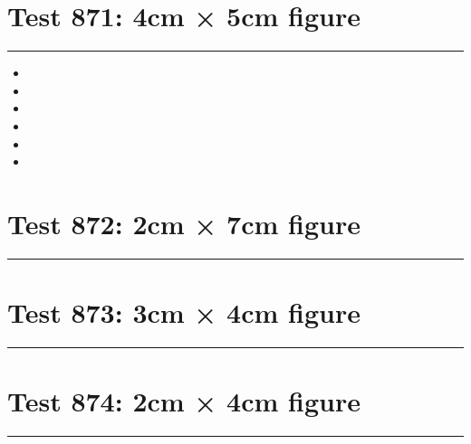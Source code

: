 \documentclass[a4paper,11pt]{article}
\begin{document}
\section*{Test 871: 4cm × 5cm figure}
\begin{swarmwrap}%
  \begin{minipage}[t]{4cm}
    \centering
    \rule{\linewidth}{5cm}
  \end{minipage}%
\end{swarmwrap}
\begin{itemize}
  \item \swarmwrapnext\lipsum[135][1-4]
  \item \lipsum[137][1-3]
  \item \lipsum[138][1-3]
  \item \lipsum[139][1-3]
  \item \lipsum[140][1-3]
  \item \lipsum[141][1-3]
\end{itemize}
\section*{Test 872: 2cm × 7cm figure}
\begin{swarmwrap}%
  \begin{minipage}[t]{2cm}
    \centering
    \rule{\linewidth}{7cm}
  \end{minipage}%
\end{swarmwrap}%
\swarmwrapnext
\lipsum[35]
\lipsum[36]
\lipsum[37]
\lipsum[38]
\section*{Test 873: 3cm × 4cm figure}
\begin{swarmwrap}%
  \begin{minipage}[t]{3cm}
    \centering
    \rule{\linewidth}{4cm}
  \end{minipage}%
\end{swarmwrap}%
\swarmwrapnext
\lipsum[17]
\lipsum[18]
\lipsum[19]
\lipsum[20]
\lipsum[21]
\section*{Test 874: 2cm × 4cm figure}
\begin{swarmwrap}%
  \begin{minipage}[t]{2cm}
    \centering
    \rule{\linewidth}{4cm}
  \end{minipage}%
\end{swarmwrap}%
\swarmwrapnext
\lipsum[30]
\lipsum[31]
\lipsum[32]
\lipsum[33]
\end{document}
